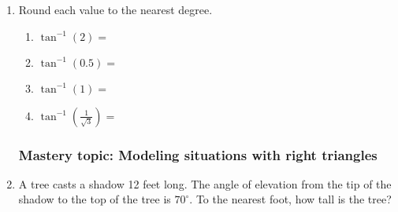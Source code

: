 \documentclass[12pt, twoside]{article}
\begin{document}
\begin{enumerate}
    \item Round each value to the nearest degree. \vspace{.5cm}
    \begin{multicols}{2}
      \begin{enumerate}
        \item $\tan^{-1} (2) = $ \vspace{1cm}
        \item $\tan^{-1} (0.5) =$
        \item $\tan^{-1} (1) = $ \vspace{1cm}
        \item $\displaystyle \tan^{-1} (\frac{1}{\sqrt{3}}) =$
      \end{enumerate}
    \end{multicols} \vspace{1cm}

\subsubsection*{Mastery topic: Modeling situations with right triangles}
\item A tree casts a shadow 12 feet long. The angle of elevation from the tip of the shadow to the top of the tree is $70^\circ$. To the nearest foot, how tall is the tree?
  \begin{flushright}
  \end{flushright}

\end{enumerate}
\end{document}
